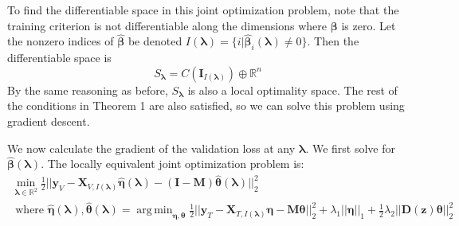 \documentclass[10pt,letterpaper]{article}
\DeclareMathOperator*{\argmin}{arg\,min}
\begin{document}
To find the differentiable space in this joint optimization problem, note that the training criterion is not differentiable along the dimensions where $\boldsymbol\beta$ is zero. Let the nonzero indices of $\hat{\boldsymbol{\beta}}$ be denoted $I(\boldsymbol\lambda) = \{i | \hat{\boldsymbol{\beta}}_i(\boldsymbol\lambda) \ne 0\}$. Then the differentiable space is
\begin{equation}
S_{\boldsymbol{\lambda}} = C(\boldsymbol I_{I(\boldsymbol\lambda)}) \oplus \mathbb{R}^n
\end{equation}
By the same reasoning as before, $S_{\boldsymbol{\lambda}}$ is also a local optimality space. The rest of the conditions in Theorem 1 are also satisfied, so we can solve this problem using gradient descent.

We now calculate the gradient of the validation loss at any $\boldsymbol{\lambda}$. We first solve for $\hat{\boldsymbol{\beta}}(\boldsymbol{\lambda})$. The locally equivalent joint optimization problem is:
\begin{equation}
\begin{array}{c}
\min_{\boldsymbol\lambda \in \mathbb{R}^2} \frac{1}{2}
\bigl\lvert\bigl\lvert
\boldsymbol{y}_V
- \boldsymbol{X}_{V, I(\boldsymbol \lambda)} \hat{\boldsymbol{\eta}}(\boldsymbol{\lambda})
- (\boldsymbol{I} - \boldsymbol{M}) \hat{\boldsymbol{\theta}}(\boldsymbol{\lambda})
\bigl\rvert\bigl\rvert^2_2 \\
\text{ where }
\hat{\boldsymbol{\eta}}(\boldsymbol{\lambda}),
\hat{\boldsymbol{\theta}}(\boldsymbol{\lambda}) =
\argmin_{\boldsymbol \eta, \boldsymbol{\theta}}
\frac{1}{2} \bigl\lvert\bigl\lvert
\boldsymbol{y}_T
- \boldsymbol{X}_{T, I(\boldsymbol \lambda)}\boldsymbol{\eta}
- \boldsymbol{M} \boldsymbol{\theta} \bigl\rvert\bigl\rvert^2_2
+ \lambda_1 \lvert\lvert \boldsymbol{\eta} \rvert \rvert_1
+ \frac{1}{2} \lambda_2 \lvert\lvert \boldsymbol{D}(\boldsymbol{z}) \boldsymbol{\theta} \rvert \rvert_2^2
\end{array}
\label{aplmRestricted}
\end{equation}
\end{document}
